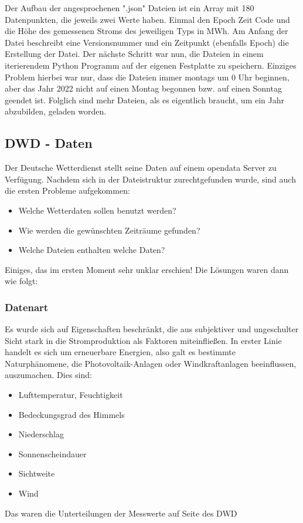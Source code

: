 \documentclass[letterpaper]{article} %
\begin{document}
        Der Aufbau der angesprochenen ".json" Dateien ist ein Array mit 180 Datenpunkten, die jeweils zwei Werte haben. Einmal den Epoch Zeit Code und die Höhe des gemessenen Stroms des jeweiligen Typs in MWh. Am Anfang der Datei beschreibt eine Versionsnummer und ein Zeitpunkt (ebenfalls Epoch) die Erstellung der Datei.
        Der nächste Schritt war nun, die Dateien in einem iterierendem Python Programm auf der eigenen Festplatte zu speichern. Einziges Problem hierbei war nur, dass die Dateien immer montags um 0 Uhr beginnen, aber das Jahr 2022 nicht auf einen Montag begonnen bzw. auf einen Sonntag geendet ist. Folglich sind mehr Dateien, als es eigentlich braucht, um ein Jahr abzubilden, geladen worden.
 
    \subsection*{DWD - Daten}
        Der Deutsche Wetterdienst stellt seine Daten auf einem opendata Server zu Verfügung. Nachdem sich in der Dateistruktur zurechtgefunden wurde, sind auch die ersten Probleme aufgekommen:
        \begin{itemize}
            \item Welche Wetterdaten sollen benutzt werden?
            \item Wie werden die gewünschten Zeiträume gefunden?
            \item Welche Dateien enthalten welche Daten?
        \end{itemize}
        Einiges, das im ersten Moment sehr unklar erschien! Die Lösungen waren dann wie folgt:
            \subsubsection*{Datenart}
                Es wurde sich auf Eigenschaften beschränkt, die aus subjektiver und ungeschulter Sicht stark in die Stromproduktion als Faktoren miteinfließen. In erster Linie handelt es sich um erneuerbare Energien, also galt es bestimmte Naturphänomene, die Photovoltaik-Anlagen oder Windkraftanlagen beeinflussen, auszumachen. Dies sind:
                \begin{itemize}
                    \item Lufttemperatur, Feuchtigkeit
                    \item Bedeckungsgrad des Himmels
                    \item Niederschlag
                    \item Sonnenscheindauer
                    \item Sichtweite
                    \item Wind
                \end{itemize}
                Das waren die Unterteilungen der Messwerte auf Seite des DWD
\end{document}
